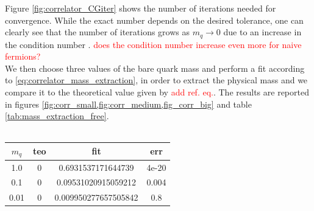 Figure \ref{fig:correlator_CGiter} shows the number of iterations needed for convergence. While the exact number depends on the desired tolerance, one can clearly see that the number of iterations grows as $m_q \to 0$ due to an increase in the condition number \cite{cond_num_ref}. \textcolor{red}{does the condition number increase even more for naive fermions?} \\
We then choose three values of the bare quark mass and perform a fit according to \eqref{eq:correlator_mass_extraction}, in order to extract the physical mass and we compare it to the theoretical value given by \textcolor{red}{add ref. eq.}. The results are reported in figures \ref{fig:corr_small,fig:corr_medium,fig_corr_big} and table \ref{tab:mass_extraction_free}. \\~\\
\begin{table}
    \centering
    \begin{tabular}[pos]{cccc}
        \toprule 
        $m_q$ & teo & fit & err \\
        \midrule 
        1.0 & 0 & 0.6931537171644739 & 4e-20 \\
        0.1 & 0 & 0.09531020915059212 & 0.004 \\
        0.01 & 0 & 0.009950277657505842 & 0.8 \\
        \bottomrule
    \end{tabular}
\end{table}
